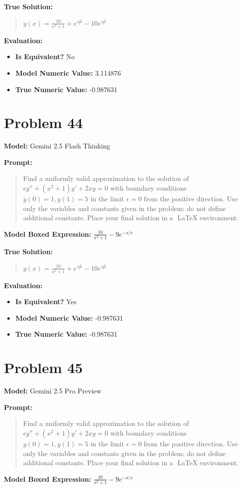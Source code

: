 \documentclass{article}
\begin{document}
\textbf{True Solution:}
\begin{quote}
$y(x) = \frac{10}{x^2+1} + e^{\frac{-x}{\epsilon}} - 10e^{\frac{-x}{\epsilon}}$
\end{quote}

\textbf{Evaluation:}
\begin{itemize}
\item \textbf{Is Equivalent?} No
\item \textbf{Model Numeric Value:} 3.114876
\item \textbf{True Numeric Value:} -0.987631
\end{itemize}
\vspace{1cm}
\section*{Problem 44}
\textbf{Model:} Gemini 2.5 Flash Thinking

\textbf{Prompt:}
\begin{quote}
Find a uniformly valid approximation to the solution of $\epsilon y'' + (x^2 +1)y'+2xy=0$ with boundary conditions $y(0)=1, y(1)=5$ in the limit $\epsilon = 0$ from the positive direction. Use only the variables and constants given in the problem; do not define additional constants. Place your final solution in a $\boxed{}$ LaTeX environment.
\end{quote}
\textbf{Model Boxed Expression:} $\frac{10}{x^2+1} - 9e^{-x/\epsilon}$

\textbf{True Solution:}
\begin{quote}
$y(x) = \frac{10}{x^2+1} + e^{\frac{-x}{\epsilon}} - 10e^{\frac{-x}{\epsilon}}$
\end{quote}

\textbf{Evaluation:}
\begin{itemize}
\item \textbf{Is Equivalent?} Yes
\item \textbf{Model Numeric Value:} -0.987631
\item \textbf{True Numeric Value:} -0.987631
\end{itemize}
\vspace{1cm}
\section*{Problem 45}
\textbf{Model:} Gemini 2.5 Pro Preview

\textbf{Prompt:}
\begin{quote}
Find a uniformly valid approximation to the solution of $\epsilon y'' + (x^2 +1)y'+2xy=0$ with boundary conditions $y(0)=1, y(1)=5$ in the limit $\epsilon = 0$ from the positive direction. Use only the variables and constants given in the problem; do not define additional constants. Place your final solution in a $\boxed{}$ LaTeX environment.
\end{quote}
\textbf{Model Boxed Expression:} $\frac{10}{x^2+1} - 9e^{-x/\epsilon}$
\end{document}
